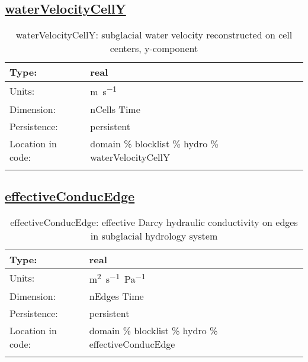 \subsection[waterVelocityCellY]{\hyperref[sec:var_tab_hydro]{waterVelocityCellY}}
\label{subsec:var_sec_hydro_waterVelocityCellY}
\begin{center}
\begin{longtable}{| p{2.0in} | p{4.0in} |}
        \hline 
        Type: & real \\
        \hline 
        Units: & \si{m.s^{-1}} \\
        \hline 
        Dimension: & nCells Time \\
        \hline 
        Persistence: & persistent \\
        \hline 
         Location in code: & domain \% blocklist \% hydro \% waterVelocityCellY \\
         \hline 
    \caption{waterVelocityCellY: subglacial water velocity reconstructed on cell centers, y-component}
\end{longtable}
\end{center}
\subsection[effectiveConducEdge]{\hyperref[sec:var_tab_hydro]{effectiveConducEdge}}
\label{subsec:var_sec_hydro_effectiveConducEdge}
\begin{center}
\begin{longtable}{| p{2.0in} | p{4.0in} |}
        \hline 
        Type: & real \\
        \hline 
        Units: & \si{m^2.s^{-1}.Pa^{-1}} \\
        \hline 
        Dimension: & nEdges Time \\
        \hline 
        Persistence: & persistent \\
        \hline 
         Location in code: & domain \% blocklist \% hydro \% effectiveConducEdge \\
         \hline 
    \caption{effectiveConducEdge: effective Darcy hydraulic conductivity on edges in subglacial hydrology system}
\end{longtable}
\end{center}

